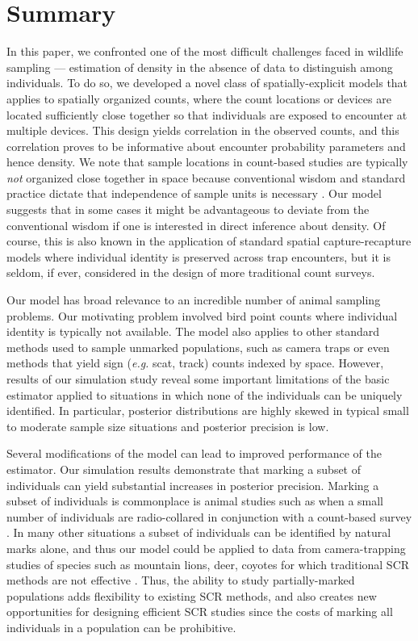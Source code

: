 \section{Summary}








In this paper, we confronted one of the most difficult challenges
faced in wildlife sampling ---
estimation of density in the absence of data to distinguish among
individuals. To do so, we developed a novel class of
spatially-explicit models that
applies to spatially organized counts, where the count locations or
devices are located sufficiently close together so that individuals
are exposed to encounter at multiple devices. This design yields
correlation in the observed counts, and this correlation proves to be
informative about encounter probability parameters and hence density.
We note that sample locations in count-based studies are typically
{\it not} organized close
together in space because conventional wisdom and standard practice
dictate that independence of sample units is necessary
\citep{hurlbert:1984}. Our model
suggests that in some cases it might be advantageous to deviate from
the conventional wisdom if one is interested in direct inference about
density. Of course, this is also known in the application of standard spatial
capture-recapture  models \citep{borchers_efford:2008}
where individual
identity is preserved across trap encounters, but it is seldom, if
ever, considered in the design of more traditional count surveys.

Our model has broad relevance to an incredible number of animal
sampling problems. Our motivating problem involved bird point counts
where individual
identity is typically not available. The model also applies
to other standard methods used to sample unmarked
populations,  such as camera traps
or even methods that yield sign ({\it e.g.} scat, track) counts
indexed by space. However, results of our simulation study reveal some
important limitations of the basic
estimator applied to situations in which none of the individuals can
be uniquely identified. In particular, posterior
distributions are highly skewed in typical small to moderate sample
size situations and posterior precision is low.

Several modifications of the model can lead to improved
performance of the estimator.
Our simulation results demonstrate that marking a subset of
individuals can yield substantial increases in posterior
precision. Marking a subset of individuals is
commonplace is animal studies such as when a small number of individuals are
radio-collared in conjunction with a count-based survey
\citep{bartmannEA:87}. In many other situations a subset of
individuals can be identified by natural marks alone, and thus our
model could be applied to data from camera-trapping studies of
species such as mountain lions, deer, coyotes for which traditional
SCR methods are not effective \citep{kellyEA:puma:08}.
Thus, the ability to study partially-marked populations
adds flexibility to existing SCR methods, and also
creates new opportunities for designing efficient SCR studies
since the costs of marking all individuals in a population can be
prohibitive.

